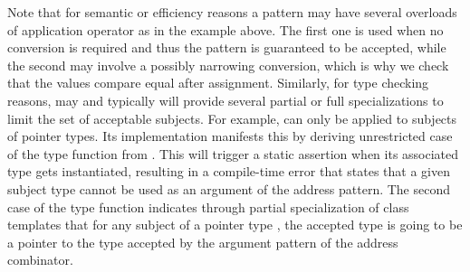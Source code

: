 %

\noindent
Note that for semantic or efficiency reasons a pattern may have several overloads 
of application operator as in the example above. The first one is used when no 
conversion is required and thus the pattern is guaranteed to be accepted, while 
the second may involve a possibly narrowing conversion, which is why we check 
that the values compare equal after assignment. Similarly, for type checking 
reasons,  may and typically will provide several partial 
or full specializations to limit the set of acceptable subjects. For example, 
 can only be applied to subjects of pointer types. Its 
implementation manifests this by deriving unrestricted case of the type function 
 from . This will trigger 
a static assertion when its associated type  gets instantiated, 
resulting in a compile-time error that states that a given subject type  
cannot be used as an argument of the address pattern. The second case of the 
type function indicates through partial specialization of class templates that 
for any subject of a pointer type , the accepted type is going to be a 
pointer to the type accepted by the argument pattern  of the address 
combinator.

